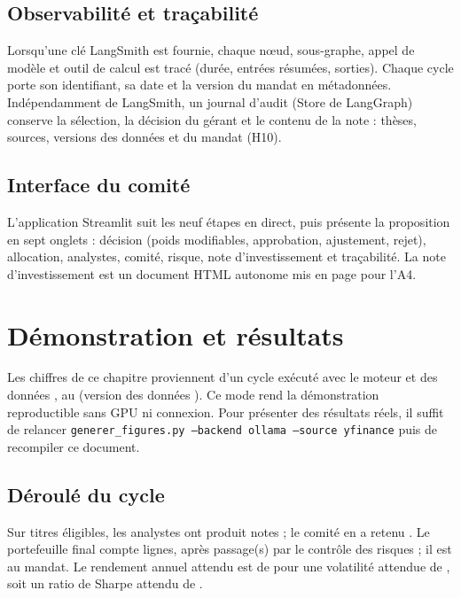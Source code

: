 \documentclass[11pt,a4paper]{report}
\begin{document}
\section{Observabilité et traçabilité}
Lorsqu'une clé LangSmith est fournie, chaque nœud, sous-graphe, appel de modèle et outil de calcul est tracé
(durée, entrées résumées, sorties). Chaque cycle porte son identifiant, sa date et la version du mandat en
métadonnées. Indépendamment de LangSmith, un journal d'audit (Store de LangGraph) conserve la sélection,
la décision du gérant et le contenu de la note : thèses, sources, versions des données et du mandat (H10).

\section{Interface du comité}
L'application Streamlit suit les neuf étapes en direct, puis présente la proposition en sept onglets :
décision (poids modifiables, approbation, ajustement, rejet), allocation, analystes, comité, risque,
note d'investissement et traçabilité. La note d'investissement est un document HTML autonome mis en page pour l'A4.

\chapter{Démonstration et résultats}\label{ch:resultats}

\begin{retenir}
Les chiffres de ce chapitre proviennent d'un cycle exécuté avec le moteur \texttt{\BackendLLM} et des données
\texttt{\SourceDonnees}, au \DateAnalyse{} (version des données \texttt{\VersionDonnees}). Ce mode rend la démonstration
reproductible sans GPU ni connexion. Pour présenter des résultats réels, il suffit de relancer
\texttt{generer\_figures.py --backend ollama --source yfinance} puis de recompiler ce document.
\end{retenir}

\section{Déroulé du cycle}
Sur \NbEligibles{} titres éligibles, les analystes ont produit \NbNotes{} notes ; le comité en a retenu
\NbSelection. Le portefeuille final compte \NbLignes{} lignes, après \NbIterations{} passage(s) par le contrôle
des risques ; il est \Conforme{} au mandat. Le rendement annuel attendu est de \RendementAttendu{} pour une
volatilité attendue de \Volatilite{}, soit un ratio de Sharpe attendu de \Sharpe{}.
\end{document}
